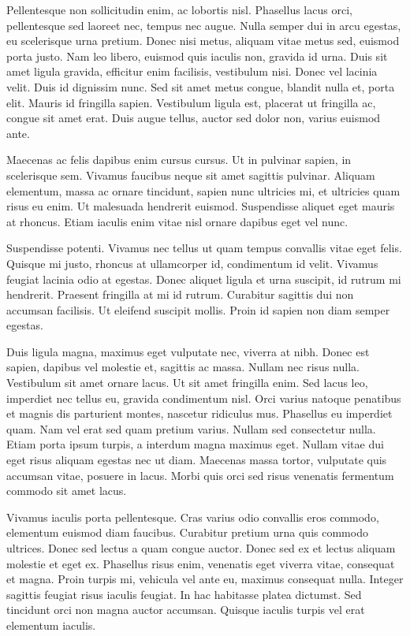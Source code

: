 Pellentesque non sollicitudin enim, ac lobortis nisl. Phasellus lacus orci, pellentesque sed laoreet nec, tempus nec augue. Nulla semper dui in arcu egestas, eu scelerisque urna pretium. Donec nisi metus, aliquam vitae metus sed, euismod porta justo. Nam leo libero, euismod quis iaculis non, gravida id urna. Duis sit amet ligula gravida, efficitur enim facilisis, vestibulum nisi. Donec vel lacinia velit. Duis id dignissim nunc. Sed sit amet metus congue, blandit nulla et, porta elit. Mauris id fringilla sapien. Vestibulum ligula est, placerat ut fringilla ac, congue sit amet erat. Duis augue tellus, auctor sed dolor non, varius euismod ante.

Maecenas ac felis dapibus enim cursus cursus. Ut in pulvinar sapien, in scelerisque sem. Vivamus faucibus neque sit amet sagittis pulvinar. Aliquam elementum, massa ac ornare tincidunt, sapien nunc ultricies mi, et ultricies quam risus eu enim. Ut malesuada hendrerit euismod. Suspendisse aliquet eget mauris at rhoncus. Etiam iaculis enim vitae nisl ornare dapibus eget vel nunc.

Suspendisse potenti. Vivamus nec tellus ut quam tempus convallis vitae eget felis. Quisque mi justo, rhoncus at ullamcorper id, condimentum id velit. Vivamus feugiat lacinia odio at egestas. Donec aliquet ligula et urna suscipit, id rutrum mi hendrerit. Praesent fringilla at mi id rutrum. Curabitur sagittis dui non accumsan facilisis. Ut eleifend suscipit mollis. Proin id sapien non diam semper egestas.

Duis ligula magna, maximus eget vulputate nec, viverra at nibh. Donec est sapien, dapibus vel molestie et, sagittis ac massa. Nullam nec risus nulla. Vestibulum sit amet ornare lacus. Ut sit amet fringilla enim. Sed lacus leo, imperdiet nec tellus eu, gravida condimentum nisl. Orci varius natoque penatibus et magnis dis parturient montes, nascetur ridiculus mus. Phasellus eu imperdiet quam. Nam vel erat sed quam pretium varius. Nullam sed consectetur nulla. Etiam porta ipsum turpis, a interdum magna maximus eget. Nullam vitae dui eget risus aliquam egestas nec ut diam. Maecenas massa tortor, vulputate quis accumsan vitae, posuere in lacus. Morbi quis orci sed risus venenatis fermentum commodo sit amet lacus.

Vivamus iaculis porta pellentesque. Cras varius odio convallis eros commodo, elementum euismod diam faucibus. Curabitur pretium urna quis commodo ultrices. Donec sed lectus a quam congue auctor. Donec sed ex et lectus aliquam molestie et eget ex. Phasellus risus enim, venenatis eget viverra vitae, consequat et magna. Proin turpis mi, vehicula vel ante eu, maximus consequat nulla. Integer sagittis feugiat risus iaculis feugiat. In hac habitasse platea dictumst. Sed tincidunt orci non magna auctor accumsan. Quisque iaculis turpis vel erat elementum iaculis.

